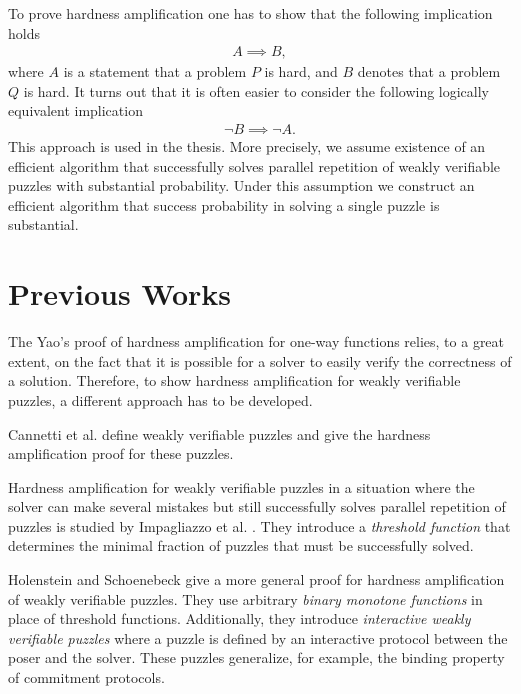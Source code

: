 To prove hardness amplification one has to show that the following implication holds
\begin{align*}
  A \implies B,
\end{align*}
where $A$ is a statement that a problem $P$ is hard, and $B$ denotes that a problem $Q$ is hard.
It turns out that it is often easier to consider the following logically equivalent implication
\begin{align*}
  \lnot B \implies \lnot A.
\end{align*}
This approach is used in the thesis. More precisely, we assume existence of an efficient algorithm that successfully
solves parallel repetition of weakly verifiable puzzles with substantial probability.
Under this assumption we construct an efficient algorithm that success probability in solving a single puzzle is substantial.

\section{Previous Works}
The Yao's proof of hardness amplification for one-way functions relies, to a great extent, on the fact that it is possible
for a solver to easily verify the correctness of a solution. Therefore, to show hardness amplification
for weakly verifiable puzzles, a different approach has to be developed.

Cannetti et al. \cite{canetti2005hardness} define weakly verifiable puzzles and give the hardness amplification proof for these puzzles.

Hardness amplification for weakly verifiable puzzles in a situation where the solver can make several mistakes but still
successfully solves parallel repetition of puzzles is studied by Impagliazzo et al. \cite{impagliazzo2007chernoff}.
They introduce a \textit{threshold function} that determines the minimal fraction of puzzles that must be successfully solved.

Holenstein and Schoenebeck \cite{holenstein2011general} give a more general proof for hardness amplification
of weakly verifiable puzzles. They use arbitrary \textit{binary monotone functions} in place of threshold functions.
Additionally, they introduce \textit{interactive weakly verifiable puzzles} where a puzzle is defined by
an interactive protocol between the poser and the solver. These puzzles generalize, for example, the binding property of commitment protocols.

